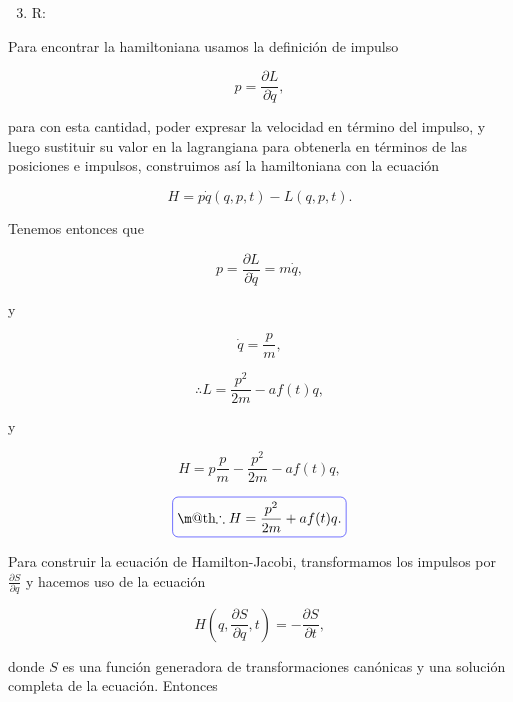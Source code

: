 \documentclass[a4paper,10pt]{article}
\makeatletter
\numberwithin{equation}{section}
\newcommand*{\boxcolor}{blue}
\renewcommand{\boxed}[1]{\textcolor{\boxcolor}{%
\tikz[baseline={([yshift=-1ex]current bounding box.center)}] \node [rectangle, minimum width=1ex,rounded corners,draw] {\normalcolor\m@th$\displaystyle#1$};}}
\makeatother
\begin{document}
\begin{enumerate}[label=\alph*)]
\setcounter{enumi}{2}
 \item R:
\end{enumerate}

Para encontrar la hamiltoniana usamos la definición de impulso 

\begin{equation}
 p = \frac{\partial L}{\partial \dot{q}},
\end{equation}

para con esta cantidad, poder expresar la velocidad en término del impulso, y luego 
sustituir su valor en la lagrangiana para obtenerla en términos de las posiciones 
e impulsos, construimos así la hamiltoniana con la ecuación 

\begin{equation}
 H = p\dot{q}(q,p,t) - L(q,p,t).
\end{equation}

Tenemos entonces que 

\begin{equation}
 p = \frac{\partial L}{\partial \dot{q}} = m\dot{q},
\end{equation}

y 

\begin{equation}
 \dot{q} = \frac{p}{m},
\end{equation}

\begin{equation}
 \therefore L = \frac{p^2}{2m} - af(t)q,
\end{equation}

y

\begin{equation}
 H = p\frac{p}{m} - \frac{p^2}{2m} - af(t)q,
\end{equation}

\begin{equation}
 \boxed{\therefore H = \frac{p^2}{2m} + af(t)q.}
\end{equation}

Para construir la ecuación de Hamilton-Jacobi, transformamos los impulsos por 
$\frac{\partial S}{\partial q}$ y hacemos uso de la ecuación 

\begin{equation}
 H\left(q,\frac{\partial S}{\partial q},t\right) = - \frac{\partial S}{\partial t},
\end{equation}

donde $S$ es una función generadora de transformaciones canónicas y una solución 
completa de la ecuación. Entonces 
\end{document}
